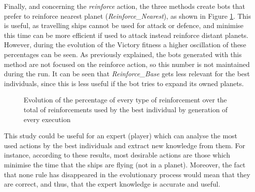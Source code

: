 \documentclass[preprint]{elsarticle}
\begin{document}
Finally, and concerning the {\em reinforce} action, the three methods create bots that prefer to reinforce nearest planet (\emph{Reinforce\_Nearest}), as shown in Figure \ref{figura:e_targetsReinforce}. This is useful, as travelling ships cannot be used for attack or defence, and minimise this time can be more efficient if used to attack instead reinforce distant planets. However, during the evolution of the Victory fitness a higher oscillation of these percentages can be seen. As previously explained, the bots generated with this method are not focused on the reinforce action, so this number is not maintained during the run. 
It can be seen that \emph{Reinforce\_Base} gets less relevant for the best individuals, since this is less useful if the bot tries to expand its owned planets.

    \begin{figure}[ht]
  \begin{center}
  \end{center}
  \caption{Evolution of the percentage of every type of reinforcement over
    the total of reinforcements used by the best individual by generation
    of every execution}
  \label{figura:e_targetsReinforce}
  \end{figure}

This study could be useful for an expert (player) which can analyse the most used actions by the best individuals and extract new knowledge from them. For instance, according to these results, most desirable actions are those which minimise the time that the ships are flying (not in a planet).
Moreover, the fact that none rule has disappeared in the evolutionary process would mean that they are correct, and thus, that the expert knowledge is accurate and useful.
\end{document}
